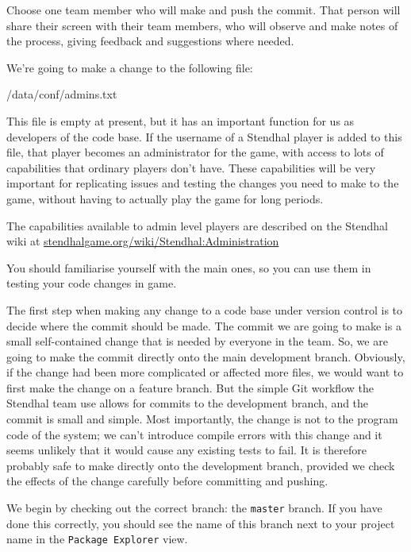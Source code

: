 \documentclass[
]{book}
\newenvironment{Shaded}{\begin{snugshade}}{\end{snugshade}}
\newcommand{\NormalTok}[1]{#1}
\begin{document}
Choose one team member who will make and push the commit. That person will share their screen with their team members, who will observe and make notes of the process, giving feedback and suggestions where needed.

We're going to make a change to the following file:

\begin{Shaded}
\begin{Highlighting}[]
\NormalTok{/data/conf/admins.txt}
\end{Highlighting}
\end{Shaded}

This file is empty at present, but it has an important function for us as developers of the code base. If the username of a Stendhal player is added to this file, that player becomes an administrator for the game, with access to lots of capabilities that ordinary players don't have. These capabilities will be very important for replicating issues and testing the changes you need to make to the game, without having to actually play the game for long periods.

The capabilities available to admin level players are described on the Stendhal wiki at \href{https://stendhalgame.org/wiki/Stendhal:Administration}{stendhalgame.org/wiki/Stendhal:Administration}

You should familiarise yourself with the main ones, so you can use them in testing your code changes in game.

The first step when making any change to a code base under version control is to decide where the commit should be made. The commit we are going to make is a small self-contained change that is needed by everyone in the team. So, we are going to make the commit directly onto the main development branch. Obviously, if the change had been more complicated or affected more files, we would want to first make the change on a feature branch. But the simple Git workflow the Stendhal team use allows for commits to the development branch, and the commit is small and simple. Most importantly, the change is not to the program code of the system; we can't introduce compile errors with this change and it seems unlikely that it would cause any existing tests to fail. It is therefore probably safe to make directly onto the development branch, provided we check the effects of the change carefully before committing and pushing.

We begin by checking out the correct branch: the \texttt{master} branch. If you have done this correctly, you should see the name of this branch next to your project name in the \texttt{Package\ Explorer} view.
\end{document}

